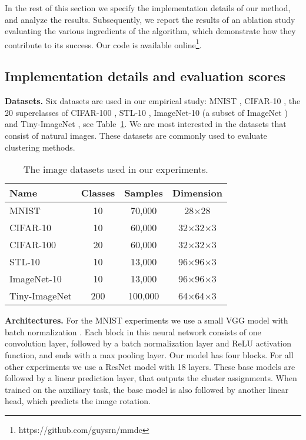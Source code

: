 \documentclass[a4paper,conference]{IEEEtran}
\begin{document}
In the rest of this section we specify the implementation details of our method, and analyze the results. Subsequently, we report the results of an ablation study evaluating the various ingredients of the algorithm, which demonstrate how they contribute to its success. Our code is available online\footnote{https://github.com/guysrn/mmdc}. 

\subsection{Implementation details and evaluation scores}
\label{sec:impl-det}

\textbf{Datasets.} Six datasets are used in our empirical study: MNIST \cite{Lecun98gradient-basedlearning}, CIFAR-10 \cite{cifar10}, the 20 superclasses of CIFAR-100 \cite{cifar10}, STL-10 \cite{stl10}, ImageNet-10 (a subset of ImageNet \cite{imagenet2009}) and Tiny-ImageNet \cite{imagenet2009}, see Table~\ref{table:datasets}. We are most interested in the datasets that consist of natural images. These datasets are commonly used to evaluate clustering methods.

\begin{table}[h]
\begin{center}
\caption{The image datasets used in our experiments.}
\label{table:datasets}
\begin{tabular}{l c c c}
\toprule
Name & Classes & Samples & Dimension \\
\midrule
MNIST & 10 & 70,000 & 28$\times$28 \\
CIFAR-10 & 10 & 60,000 & 32$\times$32$\times$3 \\
CIFAR-100 & 20 & 60,000 & 32$\times$32$\times$3 \\
STL-10 & 10 & 13,000 & 96$\times$96$\times$3 \\
ImageNet-10 & 10 & 13,000 & 96$\times$96$\times$3 \\
Tiny-ImageNet & 200 & 100,000 & 64$\times$64$\times$3 \\
\bottomrule
\end{tabular}
\end{center}
\end{table}

\textbf{Architectures.} 
For the MNIST experiments we use a small VGG model \cite{vgg} with batch normalization \cite{Ioffe2015BatchNA}. Each block in this neural network consists of one convolution layer, followed by a batch normalization layer and ReLU activation function, and ends with a max pooling layer. Our model has four blocks. For all other experiments we use a ResNet model \cite{2015DeepRL} with 18 layers. These base models are followed by a linear prediction layer, that outputs the cluster assignments. When trained on the auxiliary task, the base model is also followed by another linear head, which predicts the image rotation.
\end{document}
